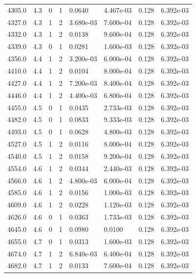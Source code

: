 \documentclass[preview]{standalone}
\begin{document}
{{{{{{\begin{tabular}{L{1.2cm}C{1.2cm} C{0.3cm}C{0.5cm} C{1.4cm}C{1.4cm} C{1.4cm}C{1.4cm}}
  4305.0  &   4.3  & 0     &  1 &  0.0640  & 4.467e-03  & 0.128 &  6.392e-03   \\ 
  4327.0  &   4.3  & 1     &  2 &  3.680e-03  & 7.600e-04  & 0.128 &  6.392e-03   \\ 
  4332.0  &   4.3  & 1     &  2 &  0.0138  & 9.600e-04  & 0.128 &  6.392e-03   \\ 
  4339.0  &   4.3  & 0     &  1 &  0.0281  & 1.600e-03  & 0.128 &  6.392e-03   \\ 
  4356.0  &   4.4  & 1     &  2 &  3.200e-03  & 6.000e-04  & 0.128 &  6.392e-03   \\ 
  4410.0  &   4.4  & 1     &  2 &  0.0104  & 8.000e-04  & 0.128 &  6.392e-03   \\ 
  4427.0  &   4.4  & 1     &  2 &  7.200e-03  & 8.400e-04  & 0.128 &  6.392e-03   \\ 
  4446.0  &   4.4  & 1     &  2 &  4.400e-03  & 6.800e-04  & 0.128 &  6.392e-03   \\ 
  4455.0  &   4.5  & 0     &  1 &  0.0435  & 2.733e-03  & 0.128 &  6.392e-03   \\ 
  4482.0  &   4.5  & 0     &  1 &  0.0833  & 9.333e-03  & 0.128 &  6.392e-03   \\ 
  4493.0  &   4.5  & 0     &  1 &  0.0628  & 4.800e-03  & 0.128 &  6.392e-03   \\ 
  4527.0  &   4.5  & 1     &  2 &  0.0116  & 8.000e-04  & 0.128 &  6.392e-03   \\ 
  4540.0  &   4.5  & 1     &  2 &  0.0158  & 9.200e-04  & 0.128 &  6.392e-03   \\ 
  4554.0  &   4.6  & 1     &  2 &  0.0344  & 2.440e-03  & 0.128 &  6.392e-03   \\ 
  4566.0  &   4.6  & 1     &  2 &  4.800e-03  & 6.000e-04  & 0.128 &  6.392e-03   \\ 
  4585.0  &   4.6  & 1     &  2 &  0.0156  & 1.000e-03  & 0.128 &  6.392e-03   \\ 
  4609.0  &   4.6  & 1     &  2 &  0.0228  & 1.120e-03  & 0.128 &  6.392e-03   \\ 
  4626.0  &   4.6  & 0     &  1 &  0.0363  & 1.733e-03  & 0.128 &  6.392e-03   \\ 
  4645.0  &   4.6  & 0     &  1 &  0.0980  & 0.0100  & 0.128 &  6.392e-03   \\ 
  4655.0  &   4.7  & 0     &  1 &  0.0313  & 1.600e-03  & 0.128 &  6.392e-03   \\ 
  4674.0  &   4.7  & 1     &  2 &  6.840e-03  & 6.400e-04  & 0.128 &  6.392e-03   \\ 
  4682.0  &   4.7  & 1     &  2 &  0.0133  & 7.600e-04  & 0.128 &  6.392e-03   \\ 

\end{tabular}}}}}}}
\end{document}
